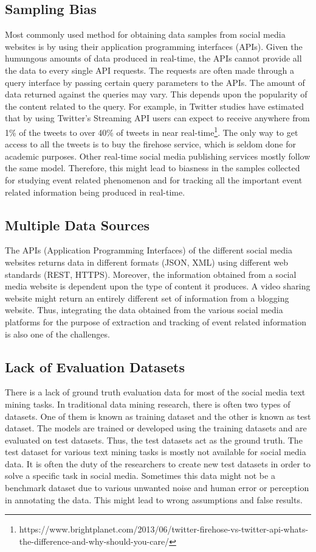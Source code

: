 \subsection{Sampling Bias}
Most commonly used method for obtaining data samples from social media websites is by using their application programming interfaces (APIs). Given the humungous amounts of data produced in real-time, the APIs cannot provide all the data to every single API requests. The requests are often made through a query interface by passing certain query parameters to the APIs. The amount of data returned against the queries may vary. This depends upon the popularity of the content related to the query. For example, in Twitter studies have estimated that by using Twitter's Streaming API users can expect to receive anywhere from 1\% of the tweets to over 40\% of tweets in near real-time\footnote{https://www.brightplanet.com/2013/06/twitter-firehose-vs-twitter-api-whats-the-difference-and-why-should-you-care/}. The only way to get access to all the tweets is to buy the firehose service, which is seldom done for academic purposes. Other real-time social media publishing services mostly follow the same model. Therefore, this might lead to biasness in the samples collected for studying event related phenomenon and for tracking all the important event related information being produced in real-time.

\subsection{Multiple Data Sources}
The APIs (Application Programming Interfaces) of the different social media websites returns data in different formats (JSON, XML) using different web standards (REST, HTTPS). Moreover, the information obtained from a social media website is dependent upon the type of content it produces. A video sharing website might return an entirely different set of information from a blogging website. Thus, integrating the data obtained from the various social media platforms for the purpose of extraction and tracking of event related information is also one of the challenges.

\subsection{Lack of Evaluation Datasets}
There is a lack of ground truth evaluation data for most of the social media text mining tasks. In traditional data mining research, there is often two types of datasets. One of them is known as training dataset and the other is known as test dataset. The models are trained or developed using the training datasets and are evaluated on test datasets. Thus, the test datasets act as the ground truth. The test dataset for various text mining tasks is mostly not available for social media data. It is often the duty of the researchers to create new test datasets in order to solve a specific task in social media. Sometimes this data might not be a benchmark dataset due to various unwanted noise and human error or perception in annotating the data. This might lead to wrong assumptions and false results.




